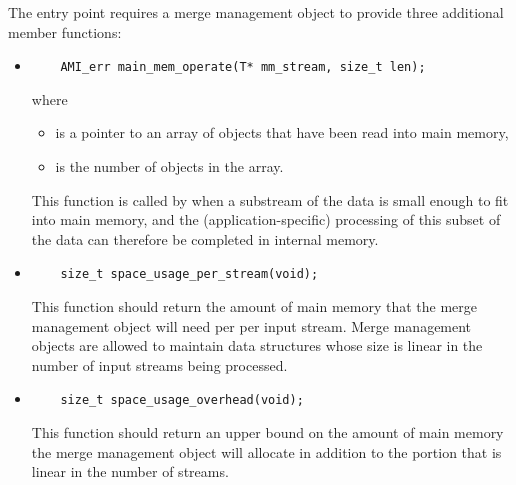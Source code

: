 
The  entry point 
requires a merge management object to provide three
additional member functions:

\begin{itemize}
    \item {}
\begin{verbatim}
    AMI_err main_mem_operate(T* mm_stream, size_t len);
\end{verbatim}
\noindent
where
    \begin{itemize}
        \item {} is a pointer to an array
        of objects that have been read into main memory,
        \item {} is the number of objects in the
        array.
    \end{itemize}
    
    This function is called by
     when a substream of
    the data is small enough to fit into main memory, and
    the (application-specific) processing of this subset of
    the data can therefore be completed in internal memory.

    
    \item {}
\begin{verbatim}
    size_t space_usage_per_stream(void);
\end{verbatim}
    This function should return the amount of main memory
    that the merge management object will need per per input
    stream. Merge management objects are allowed to maintain
    data structures whose size is linear in the number of
    input streams being processed.

    \item {}
\begin{verbatim}
    size_t space_usage_overhead(void);
\end{verbatim}
    This function should return an upper bound on the amount
    of main memory the merge
    management object will
    allocate in addition to the portion that is linear in
    the number of streams.
    
\end{itemize}


